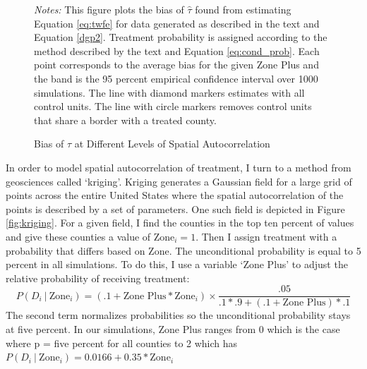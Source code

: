 \documentclass[11pt]{article}
\begin{document}
\begin{figure}[tbh!]
    \caption{Bias of $\hat{\tau}$ at Different Levels of Spatial Autocorrelation}
    \label{fig:bias_spatial_autocorr}
    {\centering
    }
    {\footnotesize
        \textit{Notes:} This figure plots the bias of $\hat{\tau}$ found from estimating Equation \ref{eq:twfe} for data generated as described in the text and Equation \ref{dgp2}. Treatment probability is assigned according to the method described by the text and Equation \ref{eq:cond_prob}. Each point corresponds to the average bias for the given Zone Plus and the band is the 95 percent empirical confidence interval over 1000 simulations. The line with diamond markers estimates with all control units. The line with circle markers removes control units that share a border with a treated county. 
    }
\end{figure}

In order to model spatial autocorrelation of treatment, I turn to a method from geosciences called `kriging'. Kriging generates a Gaussian field for a large grid of points across the entire United States where the spatial autocorrelation of the points is described by a set of parameters. One such field is depicted in Figure \ref{fig:kriging}. For a given field, I find the counties in the top ten percent of values and give these counties a value of $\text{Zone}_i = 1$. Then I assign treatment with a probability that differs based on Zone. The unconditional probability is equal to 5 percent in all simulations. To do this, I use a variable `Zone Plus' to adjust the relative probability of receiving treatment: 
\begin{equation}
    \label{eq:cond_prob}
    P(D_i \ \vert \ \text{Zone}_i) = (.1 + \text{Zone Plus} * \text{Zone}_i) \times \frac{.05}{.1 * .9 + (.1 + \text{Zone Plus}) * .1}
\end{equation}
The second term normalizes probabilities so the unconditional probability stays at five percent. In our simulations, Zone Plus ranges from 0 which is the case where p = five percent for all counties to 2 which has $P(D_i \ \vert \ \text{Zone}_i) = 0.0166 + 0.35 * \text{Zone}_i$
\end{document}
